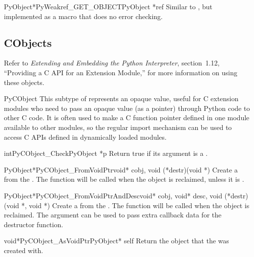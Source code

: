 \begin{cfuncdesc}{PyObject*}{PyWeakref_GET_OBJECT}{PyObject *ref}
  Similar to , but implemented as a
  macro that does no error checking.
\end{cfuncdesc}


\subsection{CObjects \label{cObjects}}

Refer to \emph{Extending and Embedding the Python Interpreter},
section~1.12, ``Providing a C API for an Extension Module,'' for more
information on using these objects.


\begin{ctypedesc}{PyCObject}
  This subtype of  represents an opaque value, useful
  for C extension modules who need to pass an opaque value (as a
   pointer) through Python code to other C code.  It is
  often used to make a C function pointer defined in one module
  available to other modules, so the regular import mechanism can be
  used to access C APIs defined in dynamically loaded modules.
\end{ctypedesc}

\begin{cfuncdesc}{int}{PyCObject_Check}{PyObject *p}
  Return true if its argument is a .
\end{cfuncdesc}

\begin{cfuncdesc}{PyObject*}{PyCObject_FromVoidPtr}{void* cobj,
                                                    void (*destr)(void *)}
  Create a  from the .  The
   function will be called when the object is reclaimed,
  unless it is \NULL{}.
\end{cfuncdesc}

\begin{cfuncdesc}{PyObject*}{PyCObject_FromVoidPtrAndDesc}{void* cobj,
	                          void* desc, void (*destr)(void *, void *)}
  Create a  from the .  The
   function will be called when the object is reclaimed.
  The  argument can be used to pass extra callback data for
  the destructor function.
\end{cfuncdesc}

\begin{cfuncdesc}{void*}{PyCObject_AsVoidPtr}{PyObject* self}
  Return the object  that the 
   was created with.
\end{cfuncdesc}

